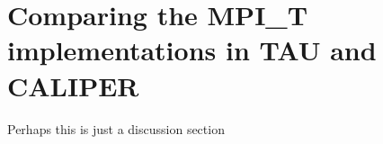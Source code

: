 \chapter{Comparing the MPI\_T implementations in TAU and CALIPER}
Perhaps this is just a discussion section

